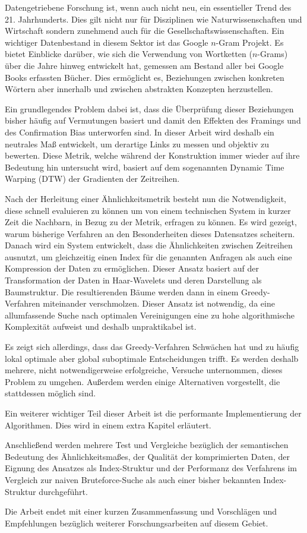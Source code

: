 \Abstract{}

Datengetriebene Forschung ist, wenn auch nicht neu, ein essentieller Trend des 21. Jahrhunderts. Dies gilt nicht nur für Disziplinen wie Naturwissenschaften und Wirtschaft sondern zunehmend auch für die Gesellschaftswissenschaften. Ein wichtiger Datenbestand in diesem Sektor ist das Google $n$-Gram Projekt. Es bietet Einblicke darüber, wie sich die Verwendung von Wortketten ($n$-Grams) über die Jahre hinweg entwickelt hat, gemessen am Bestand aller bei Google Books erfassten Bücher. Dies ermöglicht es, Beziehungen zwischen konkreten Wörtern aber innerhalb und zwischen abstrakten Konzepten herzustellen.

Ein grundlegendes Problem dabei ist, dass die Überprüfung dieser Beziehungen bisher häufig auf Vermutungen basiert und damit den Effekten des Framings und des Confirmation Bias unterworfen sind. In dieser Arbeit wird deshalb ein neutrales Maß entwickelt, um derartige Links zu messen und objektiv zu bewerten. Diese Metrik, welche während der Konstruktion immer wieder auf ihre Bedeutung hin untersucht wird, basiert auf dem sogenannten Dynamic Time Warping (DTW) der Gradienten der Zeitreihen.

Nach der Herleitung einer Ähnlichkeitsmetrik besteht nun die Notwendigkeit, diese schnell evaluieren zu können um von einem technischen System in kurzer Zeit die Nachbarn, in Bezug zu der Metrik, erfragen zu können. Es wird gezeigt, warum bisherige Verfahren an den Besonderheiten dieses Datensatzes scheitern. Danach wird ein System entwickelt, dass die Ähnlichkeiten zwischen Zeitreihen ausnutzt, um gleichzeitig einen Index für die genannten Anfragen als auch eine Kompression der Daten zu ermöglichen. Dieser Ansatz basiert auf der Transformation der Daten in Haar-Wavelets und deren Darstellung als Baumstruktur. Die resultierenden Bäume werden dann in einem Greedy-Verfahren miteinander verschmolzen. Dieser Ansatz ist notwendig, da eine allumfassende Suche nach optimalen Vereinigungen eine zu hohe algorithmische Komplexität aufweist und deshalb unpraktikabel ist.

Es zeigt sich allerdings, dass das Greedy-Verfahren Schwächen hat und zu häufig lokal optimale aber global suboptimale Entscheidungen trifft. Es werden deshalb mehrere, nicht notwendigerweise erfolgreiche, Versuche unternommen, dieses Problem zu umgehen. Außerdem werden einige Alternativen vorgestellt, die stattdessen möglich sind.

Ein weiterer wichtiger Teil dieser Arbeit ist die performante Implementierung der Algorithmen. Dies wird in einem extra Kapitel erläutert.

Anschließend werden mehrere Test und Vergleiche bezüglich der semantischen Bedeutung des Ähnlichkeitsmaßes, der Qualität der komprimierten Daten, der Eignung des Ansatzes als Index-Struktur und der Performanz des Verfahrens im Vergleich zur naiven Bruteforce-Suche als auch einer bisher bekannten Index-Struktur durchgeführt.

Die Arbeit endet mit einer kurzen Zusammenfassung und Vorschlägen und Empfehlungen bezüglich weiterer Forschungsarbeiten auf diesem Gebiet.
